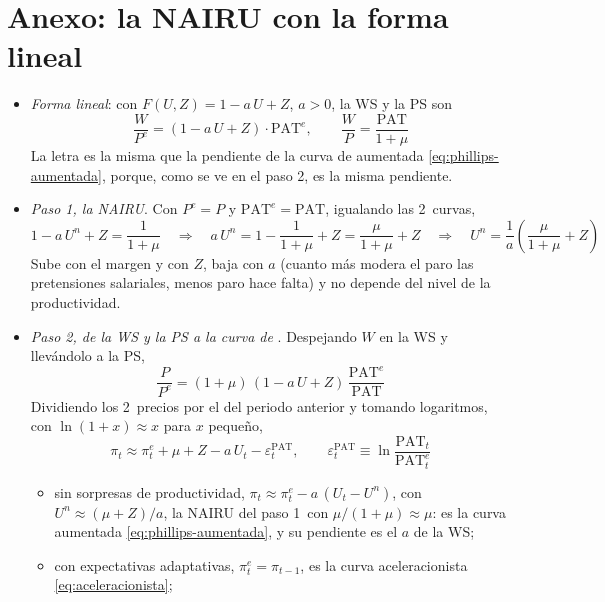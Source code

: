 \documentclass[11pt]{article}
\begin{document}
\section{Anexo: la NAIRU con la forma lineal}\label{anexo:nairu-lineal}

\begin{itemize}
\item \emph{Forma lineal}: con $F(U,Z)=1-a\,U+Z$, $a>0$, la WS y la PS son
  \begin{equation*}
  \frac{W}{P^e}=(1-a\,U+Z)\cdot\mathrm{PAT}^e,\qquad \frac{W}{P}=\frac{\mathrm{PAT}}{1+\mu}
  \end{equation*}
  La letra es la misma que la pendiente de la curva de  aumentada \eqref{eq:phillips-aumentada}, porque, como se ve en el paso 2, es la misma pendiente.
\item \emph{Paso 1, la NAIRU}. Con $P^e=P$ y $\mathrm{PAT}^e=\mathrm{PAT}$, igualando las 2~curvas,
  \begin{equation*}
  1-a\,U^n+Z=\frac{1}{1+\mu}\quad\Longrightarrow\quad a\,U^n=1-\frac{1}{1+\mu}+Z=\frac{\mu}{1+\mu}+Z\quad\Longrightarrow\quad U^n=\frac{1}{a}\left(\frac{\mu}{1+\mu}+Z\right)
  \end{equation*}
  Sube con el margen y con $Z$, baja con $a$ (cuanto más modera el paro las pretensiones salariales, menos paro hace falta) y no depende del nivel de la productividad. \findemo
\item \emph{Paso 2, de la WS y la PS a la curva de }. Despejando $W$ en la WS y llevándolo a la PS,
  \begin{equation*}
  \frac{P}{P^e}=(1+\mu)\,(1-a\,U+Z)\,\frac{\mathrm{PAT}^e}{\mathrm{PAT}}
  \end{equation*}
  Dividiendo los 2~precios por el del periodo anterior y tomando logaritmos, con $\ln(1+x)\approx x$ para $x$ pequeño,
  \begin{equation*}
  \pi_t\approx\pi^e_t+\mu+Z-a\,U_t-\varepsilon^{\mathrm{PAT}}_t,\qquad \varepsilon^{\mathrm{PAT}}_t\equiv\ln\frac{\mathrm{PAT}_t}{\mathrm{PAT}^e_t}
  \end{equation*}
  \begin{itemize}
  \item sin sorpresas de productividad, $\pi_t\approx\pi^e_t-a\,(U_t-U^n)$, con $U^n\approx(\mu+Z)/a$, la NAIRU del paso 1~con $\mu/(1+\mu)\approx\mu$: es la curva aumentada \eqref{eq:phillips-aumentada}, y su pendiente es el $a$ de la WS;
  \item con expectativas adaptativas, $\pi^e_t=\pi_{t-1}$, es la curva aceleracionista \eqref{eq:aceleracionista};

\end{itemize}
\end{itemize}
\end{document}
